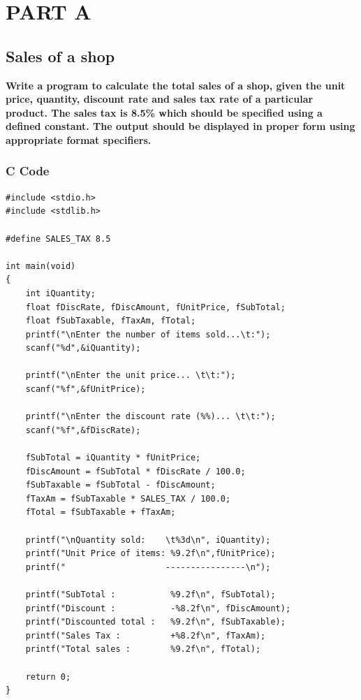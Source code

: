 \documentclass[a4paper]{report}
\begin{document}
\part{PART A}
\chapter{Sales of a shop}
{\selectfont \textbf{Write a program to calculate the total sales of a shop, given the unit price, quantity, discount rate and sales tax rate of a particular product. The sales tax is 8.5\% which should be specified using a defined constant. The output should be displayed in proper form using appropriate format specifiers. \\
}}

\section*{C Code}

\begin{Verbatim}
#include <stdio.h>
#include <stdlib.h>

#define SALES_TAX 8.5

int main(void)
{
    int iQuantity;
    float fDiscRate, fDiscAmount, fUnitPrice, fSubTotal;
    float fSubTaxable, fTaxAm, fTotal;
    printf("\nEnter the number of items sold...\t:");
    scanf("%d",&iQuantity);

    printf("\nEnter the unit price... \t\t:");
    scanf("%f",&fUnitPrice);

    printf("\nEnter the discount rate (%%)... \t\t:");
    scanf("%f",&fDiscRate);

    fSubTotal = iQuantity * fUnitPrice;
    fDiscAmount = fSubTotal * fDiscRate / 100.0;
    fSubTaxable = fSubTotal - fDiscAmount;
    fTaxAm = fSubTaxable * SALES_TAX / 100.0;
    fTotal = fSubTaxable + fTaxAm;

    printf("\nQuantity sold:    \t%3d\n", iQuantity);
    printf("Unit Price of items: %9.2f\n",fUnitPrice);
    printf("                    ----------------\n");

    printf("SubTotal :           %9.2f\n", fSubTotal);
    printf("Discount :           -%8.2f\n", fDiscAmount);
    printf("Discounted total :   %9.2f\n", fSubTaxable);
    printf("Sales Tax :          +%8.2f\n", fTaxAm);
    printf("Total sales :        %9.2f\n", fTotal);

    return 0;
}
\end{Verbatim}
\end{document}
